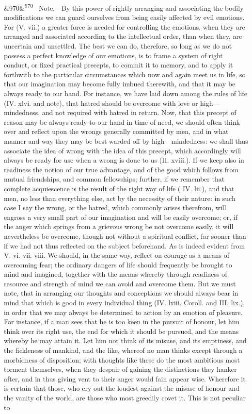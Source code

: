 \documentclass[12pt]{article}
\newcommand{\para}[1][]{\par\noindent\ifx&#1&\else\textsuperscript{\footnotesize #1}~\fi}
\begin{document}
\para[970] Note.---By this power of rightly arranging and associating the bodily modifications we can guard ourselves from being easily affected by evil emotions. For (V. vii.) a greater force is needed for controlling the emotions, when they are arranged and associated according to the intellectual order, than when they, are uncertain and unsettled. The best we can do, therefore, so long as we do not possess a perfect knowledge of our emotions, is to frame a system of right conduct, or fixed practical precepts, to commit it to memory, and to apply it forthwith to the particular circumstances which now and again meet us in life, so that our imagination may become fully imbued therewith, and that it may be always ready to our hand. For instance, we have laid down among the rules of life (IV. xlvi. and note), that hatred should be overcome with love or high---mindedness, and not required with hatred in return. Now, that this precept of reason may be always ready to our hand in time of need, we should often think over and reflect upon the wrongs generally committed by men, and in what manner and way they may be best warded off by high---mindedness: we shall thus associate the idea of wrong with the idea of this precept, which accordingly will always be ready for use when a wrong is done to us (II. xviii.). If we keep also in readiness the notion of our true advantage, and of the good which follows from mutual friendships, and common fellowships; further, if we remember that complete acquiescence is the result of the right way of life ( IV. lii.), and that men, no less than everything else, act by the necessity of their nature: in such case I say the wrong, or the hatred, which commonly arises therefrom, will engross a very small part of our imagination and will be easily overcome; or, if the anger which springs from a grievous wrong be not overcome easily, it will nevertheless be overcome, though not without a spiritual conflict, far sooner than if we had not thus reflected on the subject beforehand. As is indeed evident from V. vi. vii. viii. We should, in the same way, reflect on courage as a means of overcoming fear; the ordinary dangers of life should frequently be brought to mind and imagined, together with the means whereby through readiness of resource and strength of mind we can avoid and overcome them. But we must note, that in arranging our thoughts and conceptions we should always bear in mind that which is good in every individual thing (IV. lxiii. Coroll. and III. lix.), in order that we may always be determined to action by an emotion of pleasure. For instance, if a man sees that he is too keen in the pursuit of honour, let him think over its right use, the end for which it should be pursued, and the means whereby he may attain it. Let him not think of its misuse, and its emptiness, and the fickleness of mankind, and the like, whereof no man thinks except through a morbidness of disposition; with thoughts like these do the most ambitious most torment themselves, when they despair of gaining the distinctions they hanker after, and in thus giving vent to their anger would fain appear wise. Wherefore it is certain that those, who cry out the loudest against the misuse of honour and the vanity of the world, are those who most greedily covet it. This is not peculiar to 
\end{document}
